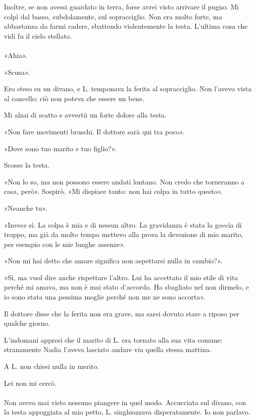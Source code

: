 \documentclass[a4paper,12pt]{book}
\begin{document}
Inoltre, se non avessi guardato in terra, forse avrei visto arrivare il pugno.
Mi colpì dal basso, subdolamente, sul sopracciglio. Non era molto forte, ma
abbastanza da farmi cadere, sbattendo violentemente la testa. L'ultima cosa che
vidi fu il cielo stellato.

\paragraph{}
«Ahia».

«Scusa».

Ero steso su un divano, e L. temponava la ferita al sopracciglio. Non l'avevo
vista al cancello; ciò non poteva che essere un bene.

Mi alzai di scatto e avvertii un forte dolore alla testa.

«Non fare movimenti bruschi. Il dottore sarà qui tra poco».

«Dove sono tuo marito e tuo figlio?».

Scosse la testa.

«Non lo so, ma non possono essere andati lontano. Non credo che torneranno a
casa, però». Sospirò. «Mi dispiace tanto: non hai colpa in tutto questo».

«Neanche tu».

«Invece sì. La colpa è mia e di nessun altro. La gravidanza è stata la goccia di
troppo, ma già da molto tempo mettevo alla prova la devozione di mio marito, per
esempio con le mie lunghe assenze».

«Non mi hai detto che amare significa non aspettarsi nulla in cambio?».

«Sì, ma vuol dire anche rispettare l'altro. Lui ha accettato il mio stile di
vita perché mi amava, ma non è mai stato d'accordo. Ha sbagliato nel non dirmelo,
e io sono stata una pessima moglie perché non me ne sono accorta».

Il dottore disse che la ferita non era grave, ma sarei dovuto stare a riposo per
qualche giorno.

L'indomani appresi che il marito di L. era tornato alla sua vita comune:
stranamente Nadia l'aveva lasciato andare via quella stessa mattina.

A L. non chiesi nulla in merito.

Lei non mi cercò.

\paragraph{}
Non avevo mai visto nessuno piangere in quel modo. Accucciata sul divano, con la
testa appoggiata al mio petto, L. singhiozzava disperatamente. Io non parlavo.
\end{document}
